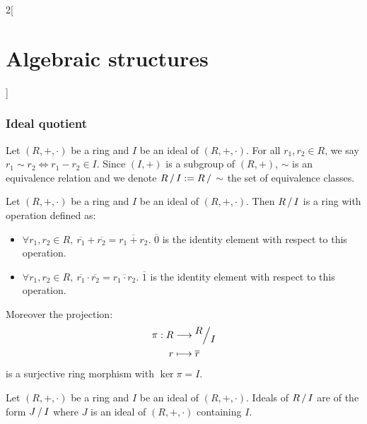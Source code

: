 \documentclass[../../../main.tex]{subfiles}
\begin{document}
\begin{multicols}{2}[\section{Algebraic structures}]
\subsubsection*{Ideal quotient}
\begin{definition}
    Let $(R,+,\cdot)$ be a ring and $I$ be an ideal of $(R,+,\cdot)$. For all $r_1,r_2\in R$, we say $r_1\sim r_2\iff r_1-r_2\in I$. Since $(I,+)$ is a subgroup of $(R,+)$, $\sim$ is an equivalence relation and we denote $\quot{R}{I}:=\quot{R}{\sim}$ the set of equivalence classes.
\end{definition}
\begin{prop}
    Let $(R,+,\cdot)$ be a ring and $I$ be an ideal of $(R,+,\cdot)$. Then $\quot{R}{I}$ is a ring with operation defined as:
    \begin{itemize}
        \item $\forall r_1,r_2\in R,\ \overline{r_1}+\overline{r_2}=\overline{r_1+r_2}$. $\overline{0}$ is the identity element with respect to this operation.
        \item $\forall r_1,r_2\in R,\ \overline{r_1}\cdot\overline{r_2}=\overline{r_1\cdot r_2}$. $\overline{1}$ is the identity element with respect to this operation.
    \end{itemize}
    Moreover the projection:
    \begin{align*}
        \pi:R&\longrightarrow\quot{R}{I}\\
        r&\longmapsto\overline{r}
    \end{align*}
    is a surjective ring morphism with $\ker\pi=I$.
\end{prop}
\begin{corollary}
    Let $(R,+,\cdot)$ be a ring and $I$ be an ideal of $(R,+,\cdot)$. Ideals of $\quot{R}{I}$ are of the form $\quot{J}{I}$ where $J$ is an ideal of $(R,+,\cdot)$ containing $I$.
\end{corollary}

\end{multicols}
\end{document}
